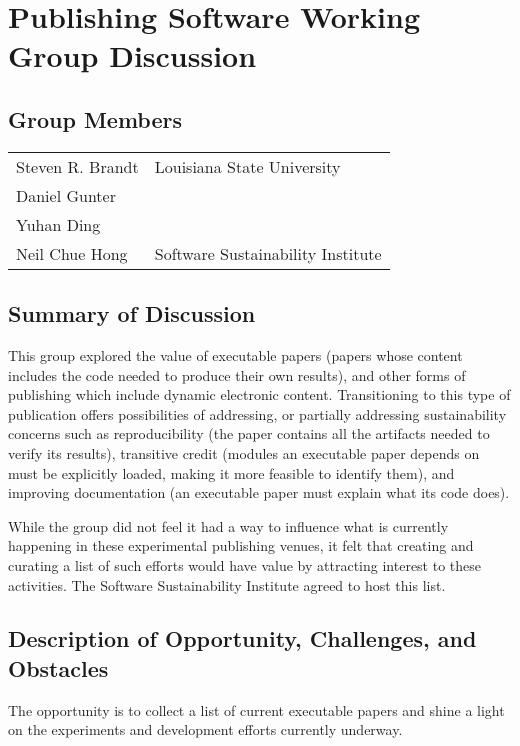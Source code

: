 \section{Publishing Software Working Group Discussion}
\label{sec:appendix_publishing_SW}

\subsection{Group Members}
{\small
\begin{longtable}{ll}
   Steven R. Brandt & Louisiana State University
\\ Daniel Gunter    & 
\\ Yuhan Ding       & 
\\ Neil Chue Hong   & Software Sustainability Institute
\end{longtable}
}

\subsection{Summary of Discussion}

This group explored the value of executable papers (papers whose content includes
the code needed to produce their own results), and other forms of publishing which
include dynamic electronic content. Transitioning to this type of publication offers
possibilities of addressing, or partially addressing sustainability concerns 
such as reproducibility (the paper contains all the artifacts needed to verify its
results), transitive credit (modules an executable paper depends on must be explicitly
loaded, making it more feasible to identify them), and improving documentation (an executable
paper must explain what its code does).

While the group did not feel it had a way to influence what is currently happening
in these experimental publishing venues, it felt that creating and curating a list of
such efforts would have value by attracting interest to these activities.
The Software Sustainability Institute agreed to host this list.

\subsection{Description of Opportunity, Challenges, and Obstacles}

The opportunity is to collect a list of current executable papers and
shine a light on the experiments and development efforts currently underway.

